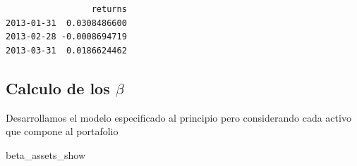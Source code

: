 \documentclass[
  letterpaper,
  DIV=11,
  numbers=noendperiod]{scrartcl}
\newenvironment{Shaded}{\begin{snugshade}}{\end{snugshade}}
\newcommand{\AttributeTok}[1]{\textcolor[rgb]{0.40,0.45,0.13}{#1}}
\newcommand{\DecValTok}[1]{\textcolor[rgb]{0.68,0.00,0.00}{#1}}
\newcommand{\FunctionTok}[1]{\textcolor[rgb]{0.28,0.35,0.67}{#1}}
\newcommand{\NormalTok}[1]{\textcolor[rgb]{0.00,0.23,0.31}{#1}}
\newcommand{\OtherTok}[1]{\textcolor[rgb]{0.00,0.23,0.31}{#1}}
\newcommand{\SpecialCharTok}[1]{\textcolor[rgb]{0.37,0.37,0.37}{#1}}
\begin{document}
\begin{verbatim}
                 returns
2013-01-31  0.0308486600
2013-02-28 -0.0008694719
2013-03-31  0.0186624462
\end{verbatim}

\subsection{\texorpdfstring{Calculo de los
\(\beta\)}{Calculo de los \textbackslash beta}}\label{calculo-de-los-beta}

Desarrollamos el modelo especificado al principio pero considerando cada
activo que compone al portafolio

\begin{Shaded}
\end{Shaded}

\begin{Shaded}
\begin{Highlighting}[]
\NormalTok{beta\_assets\_show}
\end{Highlighting}
\end{Shaded}
\end{document}
